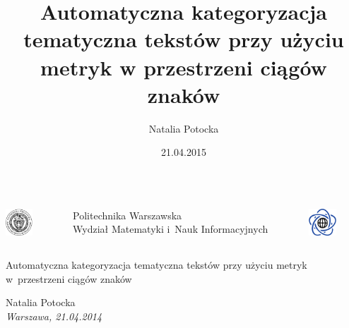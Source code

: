 \documentclass[11pt,pdftex,mathserif]{beamer}\usepackage[]{graphicx}\usepackage[]{color}
\title[Kategoryzacja tematyczna tekstów ]{Automatyczna kategoryzacja tematyczna tekstów przy użyciu metryk w przestrzeni ciągów znaków}
\author[N. Potocka]{Natalia Potocka}
\date[21.04.2015]{21.04.2015}
\theoremstyle{definition}
\begin{document}
\thispagestyle{empty}%
\begin{frame}%

   \begin{center}%
%
%
%
      \begin{columns}%
         \begin{column}[c]{1.2cm}\centering%
         \includegraphics[height=1.0cm]{logopw.pdf} \\%
         \end{column}

         \begin{column}[c]{7cm}\centering
            {\footnotesize{Politechnika Warszawska}}\\%
            {\footnotesize{Wydział Matematyki i~Nauk Informacyjnych}}%
         \end{column}

         \begin{column}[c]{1.2cm}\centering%
         \includegraphics[height=1.0cm]{logomini.pdf} \\%
         \end{column}%
      \end{columns}


      \vspace*{2em}

      \colorbox{green2}{\parbox{10cm}{\color{black}\centering\LARGE{Automatyczna kategoryzacja tematyczna tekstów przy użyciu metryk w~przestrzeni ciągów znaków}}}

      \vspace*{1.5em}%
      {\Large{Natalia Potocka}}\\%

      {\it\footnotesize Warszawa, 21.04.2014}  %

   \end{center}

\end{frame}
\end{document}
